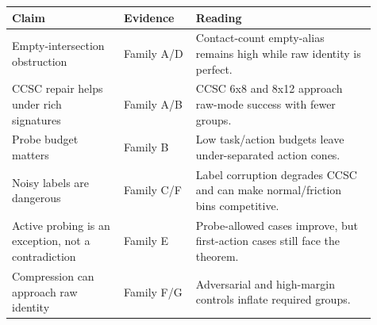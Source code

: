 \begin{tabular}{p{0.28\linewidth}p{0.18\linewidth}p{0.45\linewidth}}
\toprule
Claim & Evidence & Reading \\
\midrule
Empty-intersection obstruction & Family A/D & Contact-count empty-alias remains high while raw identity is perfect. \\
CCSC repair helps under rich signatures & Family A/B & CCSC 6x8 and 8x12 approach raw-mode success with fewer groups. \\
Probe budget matters & Family B & Low task/action budgets leave under-separated action cones. \\
Noisy labels are dangerous & Family C/F & Label corruption degrades CCSC and can make normal/friction bins competitive. \\
Active probing is an exception, not a contradiction & Family E & Probe-allowed cases improve, but first-action cases still face the theorem. \\
Compression can approach raw identity & Family F/G & Adversarial and high-margin controls inflate required groups. \\
\bottomrule
\end{tabular}
